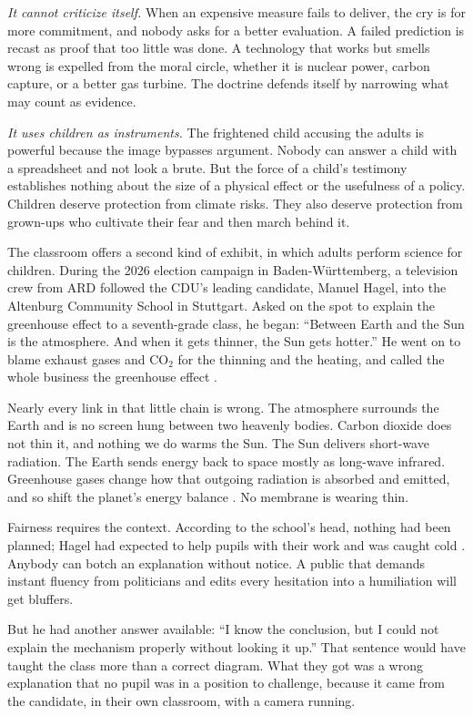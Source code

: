 \documentclass[12pt,a4paper]{book}
\begin{document}
\emph{It cannot criticize itself.} When an expensive measure fails to deliver, the cry is for more commitment, and nobody asks for a better evaluation. A failed prediction is recast as proof that too little was done. A technology that works but smells wrong is expelled from the moral circle, whether it is nuclear power, carbon capture, or a better gas turbine. The doctrine defends itself by narrowing what may count as evidence.

\emph{It uses children as instruments.} The frightened child accusing the adults is powerful because the image bypasses argument. Nobody can answer a child with a spreadsheet and not look a brute. But the force of a child's testimony establishes nothing about the size of a physical effect or the usefulness of a policy. Children deserve protection from climate risks. They also deserve protection from grown-ups who cultivate their fear and then march behind it.

The classroom offers a second kind of exhibit, in which adults perform science for children. During the 2026 election campaign in Baden-W\"urttemberg, a television crew from ARD followed the CDU's leading candidate, Manuel Hagel, into the Altenburg Community School in Stuttgart. Asked on the spot to explain the greenhouse effect to a seventh-grade class, he began: ``Between Earth and the Sun is the atmosphere. And when it gets thinner, the Sun gets hotter.'' He went on to blame exhaust gases and CO$_2$ for the thinning and the heating, and called the whole business the greenhouse effect \cite{NebelHagelClassroom2026}.

Nearly every link in that little chain is wrong. The atmosphere surrounds the Earth and is no screen hung between two heavenly bodies. Carbon dioxide does not thin it, and nothing we do warms the Sun. The Sun delivers short-wave radiation. The Earth sends energy back to space mostly as long-wave infrared. Greenhouse gases change how that outgoing radiation is absorbed and emitted, and so shift the planet's energy balance \cite{IPCC2021HumanInfluence}. No membrane is wearing thin.

Fairness requires the context. According to the school's head, nothing had been planned; Hagel had expected to help pupils with their work and was caught cold \cite{WittmerHagelSchool2026}. Anybody can botch an explanation without notice. A public that demands instant fluency from politicians and edits every hesitation into a humiliation will get bluffers.

But he had another answer available: ``I know the conclusion, but I could not explain the mechanism properly without looking it up.'' That sentence would have taught the class more than a correct diagram. What they got was a wrong explanation that no pupil was in a position to challenge, because it came from the candidate, in their own classroom, with a camera running.
\end{document}
